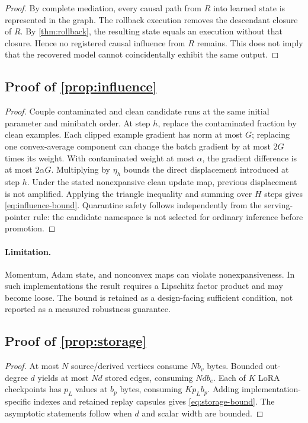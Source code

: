 \begin{proof}
By complete mediation, every causal path from $R$ into learned state is represented in the graph. The rollback execution removes the descendant closure of $R$. By \cref{thm:rollback}, the resulting state equals an execution without that closure. Hence no registered causal influence from $R$ remains. This does not imply that the recovered model cannot coincidentally exhibit the same output.
\end{proof}

\subsection{Proof of \cref{prop:influence}}

\begin{proof}
Couple contaminated and clean candidate runs at the same initial parameter and minibatch order. At step $h$, replace the contaminated fraction by clean examples. Each clipped example gradient has norm at most $G$; replacing one convex-average component can change the batch gradient by at most $2G$ times its weight. With contaminated weight at most $\alpha$, the gradient difference is at most $2\alpha G$. Multiplying by $\eta_h$ bounds the direct displacement introduced at step $h$. Under the stated nonexpansive clean update map, previous displacement is not amplified. Applying the triangle inequality and summing over $H$ steps gives \cref{eq:influence-bound}. Quarantine safety follows independently from the serving-pointer rule: the candidate namespace is not selected for ordinary inference before promotion.
\end{proof}

\paragraph{Limitation.} Momentum, Adam state, and nonconvex maps can violate nonexpansiveness. In such implementations the result requires a Lipschitz factor product and may become loose. The bound is retained as a design-facing sufficient condition, not reported as a measured robustness guarantee.

\subsection{Proof of \cref{prop:storage}}

\begin{proof}
At most $N$ source/derived vertices consume $Nb_v$ bytes. Bounded out-degree $d$ yields at most $Nd$ stored edges, consuming $Ndb_e$. Each of $K$ LoRA checkpoints has $p_L$ values at $b_p$ bytes, consuming $Kp_Lb_p$. Adding implementation-specific indexes and retained replay capsules gives \cref{eq:storage-bound}. The asymptotic statements follow when $d$ and scalar width are bounded.
\end{proof}

